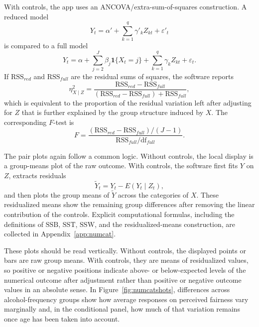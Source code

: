 \documentclass[11pt]{article}
\begin{document}
With controls, the app uses an ANCOVA/extra-sum-of-squares construction. A
reduced model
\begin{equation*}
Y_t = \alpha' + \sum_{k=1}^{q}\gamma'_k Z_{kt} + \varepsilon'_t
\end{equation*}
is compared to a full model
\begin{equation*}
Y_t = \alpha + \sum_{j=2}^{J}\beta_j \mathbf{1}\{X_t = j\}
      + \sum_{k=1}^{q}\gamma_k Z_{kt} + \varepsilon_t.
\end{equation*}
If $\mathrm{RSS}_{red}$ and $\mathrm{RSS}_{full}$ are the residual sums of
squares, the software reports
\begin{equation*}
\eta^2_{X\mid Z} =
\frac{\mathrm{RSS}_{red} - \mathrm{RSS}_{full}}
     {(\mathrm{RSS}_{red} - \mathrm{RSS}_{full}) + \mathrm{RSS}_{full}},
\end{equation*}
which is equivalent to the proportion of the residual variation left after
adjusting for $Z$ that is further explained by the group structure induced by
$X$. The corresponding $F$-test is
\begin{equation*}
F =
\frac{(\mathrm{RSS}_{red} - \mathrm{RSS}_{full})/(J-1)}
     {\mathrm{RSS}_{full}/\mathrm{df}_{full}}.
\end{equation*}

The pair plots again follow a common logic. Without controls, the local display
is a group-means plot of the raw outcome. With controls, the software first
fits $Y$ on $Z$, extracts residuals
\begin{equation*}
\tilde{Y}_t = Y_t - \widehat{E}(Y_t \mid Z_t),
\end{equation*}
and then plots the group means of $\tilde{Y}$ across the categories of $X$.
These residualized means show the remaining group differences after removing
the linear contribution of the controls. Explicit computational formulas,
including the definitions of $\mathrm{SSB}$, $\mathrm{SST}$, $\mathrm{SSW}$,
and the residualized-means construction, are collected in
Appendix~\ref{app:numcat}.

These plots should be read vertically. Without controls, the displayed points
or bars are raw group means. With controls, they are means of residualized
values, so positive or negative positions indicate above- or below-expected
levels of the numerical outcome after adjustment rather than positive or
negative outcome values in an absolute sense. In
Figure~\ref{fig:numcatshots}, differences across alcohol-frequency groups show
how average responses on perceived fairness vary marginally and, in the
conditional panel, how much of that variation remains once age has been taken
into account.
\end{document}

